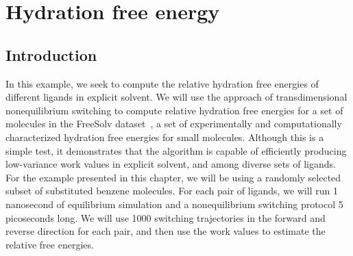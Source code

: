 \chapter{Hydration free energy}

\section{Introduction}
%
In this example, we seek to compute the relative hydration free energies of different ligands in explicit solvent.
%
We will use the approach of transdimensional nonequilibrium switching to compute relative hydration free energies for a set of molecules in the FreeSolv dataset~\cite{Mobley2014,DuarteRamosMatos2017}, a set of experimentally and computationally characterized hydration free energies for small molecules.
%
Although this is a simple test, it demonstrates that the algorithm is capable of efficiently producing low-variance work values in explicit solvent, and among diverse sets of ligands.
%
For the example presented in this chapter, we will be using a randomly selected subset of substituted benzene molecules.
%
For each pair of ligands, we will run 1 nanosecond of equilibrium simulation and a nonequilibrium switching protocol 5 picoseconds long. 
%
We will use 1000 switching trajectories in the forward and reverse direction for each pair, and then use the work values to estimate the relative free energies.
%
